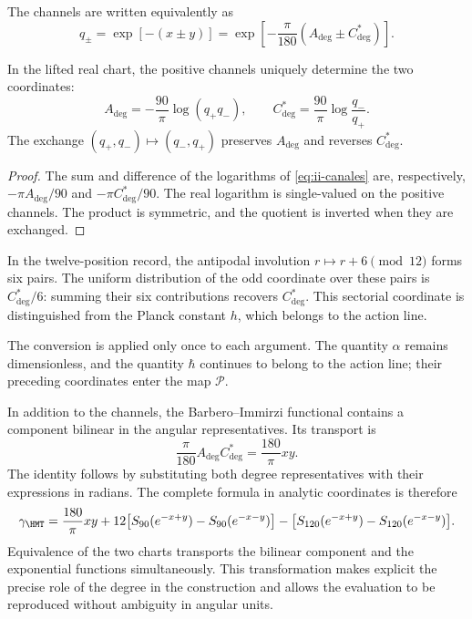 The channels are written equivalently as
\begin{equation}
 q_\pm=\exp[-(x\pm y)]
 =\exp\!\left[-\frac{\pi}{180}(A_{\deg}\pm C^*_{\deg})\right].
\label{eq:ii-canales}
\end{equation}
\begin{proposition}
\label{prop:ii-inversion-canales-angulares}
In the lifted real chart, the positive channels uniquely
determine the two coordinates:
\[
 A_{\deg}=-\frac{90}{\pi}\log(q_+q_-),\qquad
 C^*_{\deg}=\frac{90}{\pi}\log\frac{q_-}{q_+}.
\]
The exchange \((q_+,q_-)\mapsto(q_-,q_+)\) preserves
\(A_{\deg}\) and reverses \(C^*_{\deg}\).
\end{proposition}
\begin{proof}
The sum and difference of the logarithms of
\eqref{eq:ii-canales} are, respectively,
\(-\pi A_{\deg}/90\) and \(-\pi C^*_{\deg}/90\).
The real logarithm is single-valued on the positive channels.
The product is symmetric, and the quotient is inverted when they are exchanged.
\end{proof}
In the twelve-position record, the antipodal involution
\(r\mapsto r+6\pmod {12}\) forms six pairs. The uniform
distribution of the odd coordinate over these pairs is
\(C^*_{\deg}/6\): summing their six contributions recovers
\(C^*_{\deg}\). This sectorial coordinate is distinguished from
the Planck constant \(h\), which belongs to the action line.

The conversion is applied only once to each argument. The quantity
\(\alpha\) remains dimensionless, and the quantity \(\hbar\)
continues to belong to the action line; their preceding coordinates
enter the map \(\mathcal P\).

In addition to the channels, the Barbero--Immirzi functional contains a
component bilinear in the angular representatives. Its transport is
\begin{equation}
 \frac{\pi}{180}A_{\deg}C^*_{\deg}
 =\frac{180}{\pi}xy.
 \label{eq:ii-barbero-cartas}
\end{equation}
The identity follows by substituting both degree representatives
with their expressions in radians. The complete formula in analytic
coordinates is therefore
\[
 \gamma_{\HMT}
 =\frac{180}{\pi}xy
 +12\bigl[S_{90}(e^{-x+y})-S_{90}(e^{-x-y})\bigr]
 -\bigl[S_{120}(e^{-x+y})-S_{120}(e^{-x-y})\bigr].
\]
Equivalence of the two charts transports the bilinear component
and the exponential functions simultaneously. This transformation
makes explicit the precise role of the degree in the construction and allows
the evaluation to be reproduced without ambiguity in angular units.
